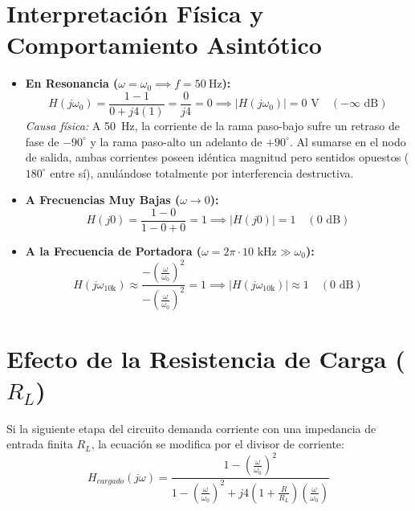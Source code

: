 \documentclass[11pt,a4paper,twoside]{article}
\begin{document}
\section{Interpretación Física y Comportamiento Asintótico}
\begin{itemize}
    \item \textbf{En Resonancia ($\omega = \omega_0 \implies f = \qty{50}{\hertz}$):}
    \begin{equation*}
        H(j\omega_0) = \frac{1 - 1}{0 + j4(1)} = \frac{0}{j4} = 0 \implies \vert{}H(j\omega_0)\vert{} = 0\text{ V} \quad (-\infty\text{ dB})
    \end{equation*}
    \textit{Causa física:} A \qty{50}{\hertz}, la corriente de la rama paso-bajo sufre un retraso de fase de $-90^\circ$ y la rama paso-alto un adelanto de $+90^\circ$. Al sumarse en el nodo de salida, ambas corrientes poseen idéntica magnitud pero sentidos opuestos ($180^\circ$ entre sí), anulándose totalmente por interferencia destructiva.

    \item \textbf{A Frecuencias Muy Bajas ($\omega \to 0$):}
    \begin{equation*}
        H(j0) = \frac{1 - 0}{1 - 0 + 0} = 1 \implies \vert{}H(j0)\vert{} = 1 \quad (0\text{ dB})
    \end{equation*}

    \item \textbf{A la Frecuencia de Portadora ($\omega = 2\pi \cdot 10\text{ kHz} \gg \omega_0$):}
    \begin{equation*}
        H(j\omega_{10\text{k}}) \approx \frac{-\left(\frac{\omega}{\omega_0}\right)^2}{-\left(\frac{\omega}{\omega_0}\right)^2} = 1 \implies \vert{}H(j\omega_{10\text{k}})\vert{} \approx 1 \quad (0\text{ dB})
    \end{equation*}
\end{itemize}

\section{Efecto de la Resistencia de Carga ($R_L$)}
Si la siguiente etapa del circuito demanda corriente con una impedancia de entrada finita $R_L$, la ecuación se modifica por el divisor de corriente:
\begin{equation}
    H_{cargado}(j\omega) = \frac{1 - \left(\frac{\omega}{\omega_0}\right)^2}{1 - \left(\frac{\omega}{\omega_0}\right)^2 + j 4 \left(1 + \frac{R}{R_L}\right) \left(\frac{\omega}{\omega_0}\right)}
\end{equation}
\end{document}
